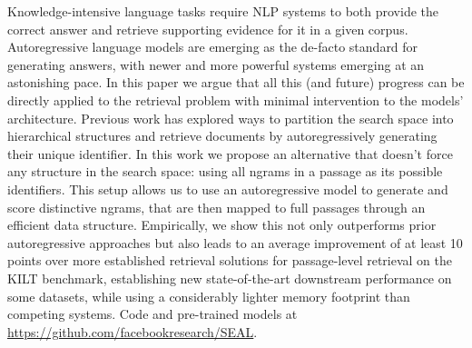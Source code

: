 Knowledge-intensive language tasks require NLP systems to both provide the correct answer and retrieve supporting evidence for it in a given corpus. 
Autoregressive language models are emerging as the de-facto standard for generating answers, with newer and more powerful systems emerging at an astonishing pace.
In this paper we argue that all this (and future) progress can be directly applied to the retrieval problem with minimal intervention to the models' architecture. 
Previous work has explored ways to partition the search space into hierarchical structures and retrieve documents by autoregressively generating their unique identifier.
In this work we propose an alternative that doesn't force any structure in the search space: using all ngrams in a passage as its possible identifiers. This setup allows us to use an autoregressive model to generate and score distinctive ngrams, that are then mapped to full passages through an efficient data structure.
Empirically, we show this not only outperforms prior autoregressive approaches but also leads to an average improvement of at least 10 points over more established retrieval solutions for passage-level retrieval on the KILT benchmark, establishing new state-of-the-art downstream performance on some datasets, while using a considerably lighter memory footprint than competing systems. Code and pre-trained models at \url{https://github.com/facebookresearch/SEAL}.
